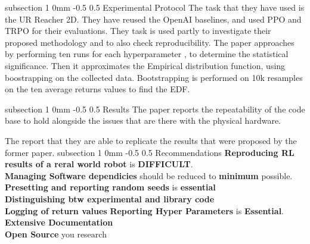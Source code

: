 \documentclass[twocolumn,11pt]{article}
\makeatletter
\renewcommand{\subsection}{\@startsection
{subsection}%
{1}%
{0mm}%
{-0.5\baselineskip}%
{0.5\baselineskip}%
{\bfseries\color{blue}}} %
\makeatother
\begin{document}
\subsection{Experimental Protocol}
The task that  they have used is the  UR Reacher 2D. They have reused the OpenAI baselines, and used PPO and TRPO for their evaluations. 
They task is used partly to investigate  their proposed methodology and to  also check reproducibility. 
The paper approaches by performing ten runs for each  hyperparameter ,  to determine the statistical significance. Then it approximates the Empirical  distribution function,  using boostrapping on the collected data. 
Bootstrapping is performed on 10k resamples on the ten average  returns  values to find the  EDF. 

\subsection{Results}
The paper reports  the repeatability of the code base  to hold alongside the issues that are there  with the  physical hardware. 

The report that they are able to replicate the results that were proposed by  the former paper.
\subsection{Recommendations}
\textbf{Reproducing RL results of a reral world robot} is \textbf{DIFFICULT}.\\
\textbf{Managing Software dependicies} should be reduced to \textbf{minimum} possible. \\
\textbf{Presetting and reporting random seeds}  is \textbf{essential}\\
\textbf{Distinguishing btw experimental and library code}\\
\textbf{Logging of return values}
\textbf{Reporting Hyper Parameters} is \textbf{Essential}.\\
\textbf{Extensive  Documentation}\\
\textbf{Open Source }  you research  




\end{document}
